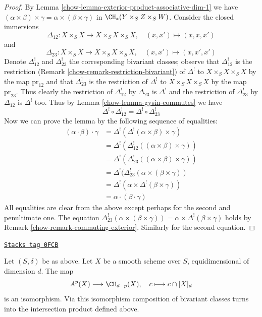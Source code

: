 \begin{proof}

By Lemma \ref{chow-lemma-exterior-product-associative-dim-1} we have
$(\alpha \times \beta) \times \gamma =
\alpha \times (\beta \times \gamma)$ in $\CH_*(Y \times_S Z \times_S W)$.
Consider the closed immersions
$$
\Delta_{12} : X \times_S X \longrightarrow X \times_S X \times_S X,
\quad (x, x') \mapsto (x, x, x')
$$
and
$$
\Delta_{23} : X \times_S X \longrightarrow X \times_S X \times_S X,
\quad (x, x') \mapsto (x, x', x')
$$
Denote $\Delta_{12}^!$ and $\Delta_{23}^!$ the corresponding bivariant
classes; observe that $\Delta_{12}^!$ is the restriction
(Remark \ref{chow-remark-restriction-bivariant}) of $\Delta^!$
to $X \times_S X \times_S X$ by the map $\text{pr}_{12}$ and that
$\Delta_{23}^!$ is the restriction of $\Delta^!$
to $X \times_S X \times_S X$ by the map $\text{pr}_{23}$.
Thus clearly the restriction of $\Delta_{12}^!$ by $\Delta_{23}$
is $\Delta^!$ and the restriction of $\Delta_{23}^!$ by $\Delta_{12}$ is
$\Delta^!$ too. Thus by Lemma \ref{chow-lemma-gysin-commutes} we have
$$
\Delta^! \circ \Delta_{12}^! =
\Delta^! \circ \Delta_{23}^!
$$
Now we can prove the lemma by the following sequence of equalities:
\begin{align*}
(\alpha \cdot \beta) \cdot \gamma
& =
\Delta^!(\Delta^!(\alpha \times \beta) \times \gamma) \\
& =
\Delta^!(\Delta_{12}^!((\alpha \times \beta) \times \gamma)) \\
& =
\Delta^!(\Delta_{23}^!((\alpha \times \beta) \times \gamma)) \\
& =
\Delta^!(\Delta_{23}^!(\alpha \times (\beta \times \gamma)) \\
& =
\Delta^!(\alpha \times \Delta^!(\beta \times \gamma)) \\
& =
\alpha \cdot (\beta \cdot \gamma)
\end{align*}
All equalities are clear from the above except perhaps
for the second and penultimate one. The equation
$\Delta_{23}^!(\alpha \times (\beta \times \gamma)) =
\alpha \times \Delta^!(\beta \times \gamma)$ holds by
Remark \ref{chow-remark-commuting-exterior}. Similarly for the second
equation.
\end{proof}

\begin{lemma}
\label{chow-lemma-identify-chow-for-smooth-dim-1}
\href{https://stacks.math.columbia.edu/tag/0FCB}{\texttt{Stacks tag 0FCB}}

Let $(S, \delta)$ be as above. Let $X$ be a smooth scheme over $S$,
equidimensional of dimension $d$. The map
$$
A^p(X) \longrightarrow \CH_{d - p}(X),\quad
c \longmapsto c \cap [X]_d
$$
is an isomorphism. Via this isomorphism composition of bivariant
classes turns into the intersection product defined above.
\end{lemma}

